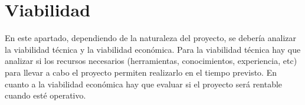 \section{Viabilidad}
En este apartado, dependiendo de la naturaleza del proyecto, se
debería analizar la viabilidad técnica y la viabilidad económica. Para
la viabilidad técnica hay que analizar si los recursos
necesarios (herramientas, conocimientos, experiencia, etc)  para llevar
a cabo el proyecto permiten realizarlo en el tiempo previsto.
En cuanto a la viabilidad económica hay que evaluar si el proyecto
será rentable cuando esté operativo.
